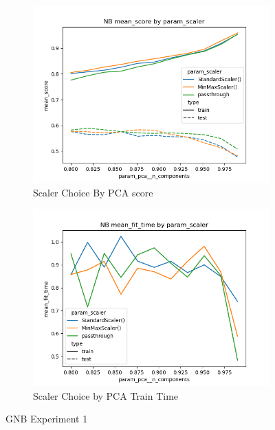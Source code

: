 \documentclass[12pt]{article}
\begin{document}
\begin{figure}
    \begin{subfigure}{.5\textwidth}
        \includegraphics[width=.95\textwidth]{../../results_Experiment1/nb/param_scaler_mean_score_param_pca__n_components.png}
        \caption{Scaler Choice By PCA score}
        \end{subfigure}%
      \begin{subfigure}{.5\textwidth}
        \includegraphics[width=.95\textwidth]{../../results_Experiment1/nb/param_scaler_mean_fit_time_param_pca__n_components.png}
        \caption{Scaler Choice by PCA Train Time}
      \end{subfigure}
      \caption{GNB Experiment 1}
      \label{figure3}
\end{figure}
\end{document}
